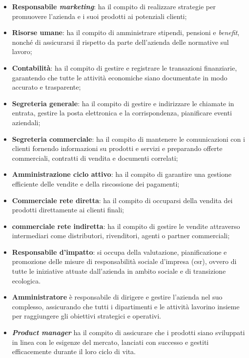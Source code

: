 \begin{itemize}
    \item \textbf{Responsabile \textit{marketing}}: ha il compito di realizzare strategie per promuovere l'azienda 
          e i suoi prodotti ai potenziali clienti;
    \item \textbf{Risorse umane}: ha il compito di amministrare stipendi, pensioni e \textit{benefit}, nonché di assicurarsi il rispetto da parte 
          dell'azienda delle normative sul lavoro;
    \item \textbf{Contabilità}: ha il compito di gestire e registrare le transazioni finanziarie, garantendo che tutte le attività economiche 
          siano documentate in modo accurato e trasparente;
    \item \textbf{Segreteria generale}: ha il compito di gestire e indirizzare le chiamate in entrata, gestire la posta elettronica e la 
          corrispondenza, pianificare eventi aziendali;
    \item \textbf{Segreteria commerciale}: ha il compito di mantenere le comunicazioni con i clienti fornendo informazioni su prodotti e 
          servizi e preparando offerte commerciali, contratti di vendita e documenti correlati;
    \item \textbf{Amministrazione ciclo attivo}: ha il compito di garantire una gestione efficiente delle vendite e della riscossione dei pagamenti;
    \item \textbf{Commerciale rete diretta}: ha il compito di occuparsi della vendita dei prodotti direttamente ai clienti finali;
    \item \textbf{commerciale rete indiretta}: ha il compito di gestire le vendite attraverso intermediari come distributori, rivenditori, agenti o partner commerciali;
    \item \textbf{Responsabile d'impatto}: si occupa della valutazione, pianificazione e promozione delle misure di responsabilità sociale d'impresa 
          (\gls{csr}), ovvero di tutte le iniziative attuate dall'azienda in ambito sociale e di transizione ecologica.
    \item \textbf{Amministratore} è responsabile di dirigere e gestire l'azienda nel suo complesso, assicurando che tutti i dipartimenti e le attività 
          lavorino insieme per raggiungere gli obiettivi strategici e operativi.
    \item \textbf{\textit{Product manager}} ha il compito di assicurare che i prodotti siano sviluppati in linea con le esigenze del mercato, lanciati con
          successo e gestiti efficacemente durante il loro ciclo di vita.
\end{itemize}
